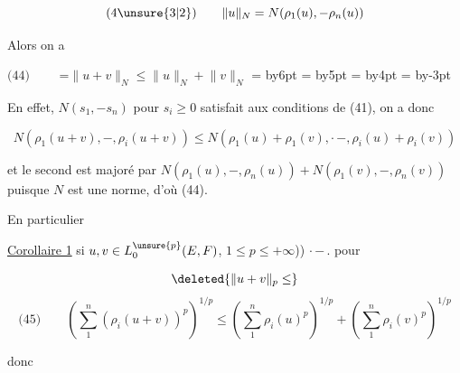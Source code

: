 \[
\text{(4\unsure{3|2})}\qquad
\lVert u\rVert_N=N(\rho_1(u),\mathord{-}\rho_n(u))
\]

Alors on a

\begin{center}
\(\text{(44)}\qquad\)
\begingroup
{}=\hbox{$\lVert u+v\rVert_N\leq\lVert u\rVert_N+\lVert v\rVert_N$}
=\advance{} by6pt
=\advance{} by5pt
=\advance{} by4pt
=\advance{} by-3pt
\leavevmode\hspace{3pt}
\hspace{6pt}
\endgroup
\end{center}


En effet, $N(s_1,\mathord{-}s_n)$ pour $s_i\geq0$ satisfait aux conditions de (41), on a donc

\[
N(\rho_1(u+v),\mathord{-},\rho_i(u+v))\leq
N(\rho_1(u)+\rho_1(v),\mathord{\cdot}\,\mathord{-},\rho_i(u)+\rho_i(v))
\]

et le second  est majoré par $N(\rho_1(u),\mathord{-},\rho_n(u))+N(\rho_1(v),\mathord{-},\rho_n(v))$ puisque $N$ est une norme, d'où (44).

En particulier

\uline{Corollaire 1}  si $u,v\in L_0^{\unsure{p}}(E,F)$,   $1\leq p\leq+\infty$)) $\mathord{\cdot}\,\mathord{-}\,.$ pour  

\[
\deleted{\lVert u+v\rVert_p\leq}
\]
\[
\text{(45)}\qquad
\left(\sum_1^n(\rho_i(u+v))^p\right)^{1/p}\leq
\left(\sum_1^n\rho_i(u)^p\right)^{1/p}+
\left(\sum_1^n\rho_i(v)^p\right)^{1/p}
\]

donc   \deleted{$\unsure{\sum}$}

